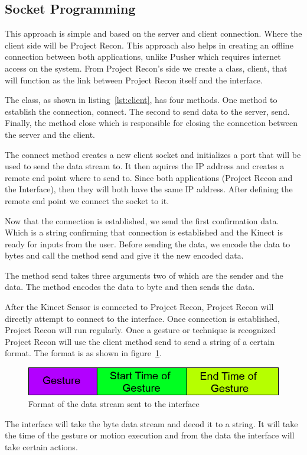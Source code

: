 \subsection{Socket Programming}
This approach is simple and based on the server and client connection. Where the client side will be Project Recon. This approach also helps in creating an offline connection between both applications, unlike Pusher which requires internet access on the system. From Project Recon's side we create a class, client, that will function as the link between Project Recon itself and the interface.

The class, as shown in listing~\ref{lst:client}, has four methods. One method to establish the connection, connect. The second to send data to the server, send. Finally, the method close which is responsible for closing the connection between the server and the client.



The connect method creates a new client socket and initializes a port that will be used to send the data stream to. It then aquires the IP address and creates a remote end point where to send to. Since both applications (Project Recon and the Interface), then they will both have the same IP address. After defining the remote end point we connect the socket to it.

Now that the connection is established, we send the first confirmation data. Which is a string confirming that connection is established and the Kinect is ready for inputs from the user. Before sending the data, we encode the data to bytes and call the method send and give it the new encoded data.

The method send takes three arguments two of which are the sender and the data. The method encodes the data to byte and then sends the data.

After the Kinect Sensor is connected to Project Recon, Project Recon will directly attempt to connect to the interface. Once connection is established, Project Recon will run regularly. Once a gesture or technique is recognized Project Recon will use the client method send to send a string of a certain format. The format is as shown in figure~\ref{format}.

\begin{figure}[!htb]
\centering
\includegraphics[width=1\textwidth]{images/format.png}
\caption{Format of the data stream sent to the interface}
\label{format}
\end{figure}

The interface will take the byte data stream and decod it to a string. It will take the time of the gesture or motion execution and from the data the interface will take certain actions.